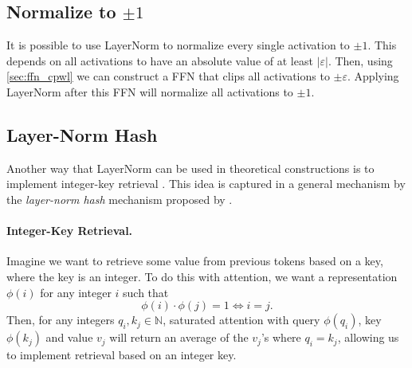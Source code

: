 \subsection{Normalize to \texorpdfstring{${\pm}1$}{plus/minus 1}}

It is possible to use LayerNorm to normalize every single activation to $\pm1$. This depends on all activations to have an absolute value of at least $|\varepsilon|$. Then, using \ref{sec:ffn_cpwl} we can construct a FFN that clips all activations to $\pm\varepsilon$. Applying LayerNorm after this FFN will normalize all activations to $\pm1$.

\subsection{Layer-Norm Hash} \label{sec:ln_hash}

Another way that LayerNorm can be used in theoretical constructions is to implement integer-key retrieval \citep{yao-2021-self-attention,merrill-sabharwal-2024-cot,merrill2024little}.
This idea is captured in a general mechanism by the \emph{layer-norm hash} mechanism proposed by \citet{merrill-sabharwal-2024-cot}.

\paragraph{Integer-Key Retrieval.}
Imagine we want to retrieve some value from previous tokens based on a key, where the key is an integer.
To do this with attention, we want a representation $\phi(i)$ for any integer $i$ such that
\begin{equation} \label{eq:integer-key-retrieval}
    \phi(i) \cdot \phi(j) = 1 \iff i = j .
\end{equation}
Then, for any integers $q_i, k_j \in \mathbb N$, saturated attention with query $\phi(q_i)$, key $\phi(k_j)$ and value $v_j$ will return an average of the $v_j$'s where $q_i = k_j$, allowing us to implement retrieval based on an integer key.

